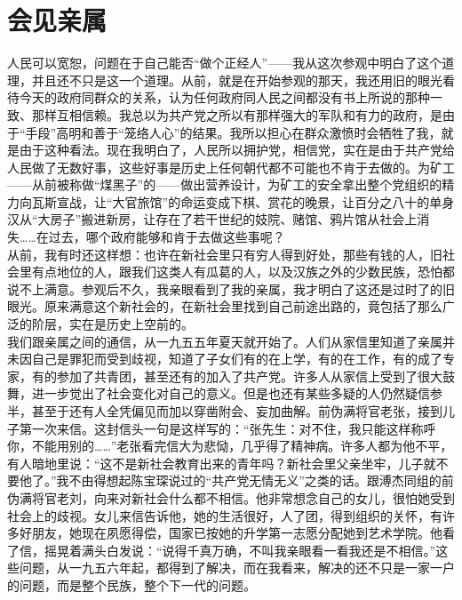 \fancyhead[RO]{} %
\fancyhead[LE]{} %
\chapter*{会见亲属}
\thispagestyle{empty}
人民可以宽恕，问题在于自己能否“做个正经人”——我从这次参观中明白了这个道理，并且还不只是这一个道理。从前，就是在开始参观的那天，我还用旧的眼光看待今天的政府同群众的关系，认为任何政府同人民之间都没有书上所说的那种一致、那样互相信赖。我总以为共产党之所以有那样强大的军队和有力的政府，是由于“手段”高明和善于“笼络人心”的结果。我所以担心在群众激愤时会牺牲了我，就是由于这种看法。现在我明白了，人民所以拥护党，相信党，实在是由于共产党给人民做了无数好事，这些好事是历史上任何朝代都不可能也不肯于去做的。为矿工——从前被称做“煤黑子”的——做出营养设计，为矿工的安全拿出整个党组织的精力向瓦斯宣战，让“大官旅馆”的命运变成下棋、赏花的晚景，让百分之八十的单身汉从“大房子”搬进新房，让存在了若干世纪的妓院、赌馆、鸦片馆从社会上消失……在过去，哪个政府能够和肯于去做这些事呢？　\\

从前，我有时还这样想：也许在新社会里只有穷人得到好处，那些有钱的人，旧社会里有点地位的人，跟我们这类人有瓜葛的人，以及汉族之外的少数民族，恐怕都说不上满意。参观后不久，我亲眼看到了我的亲属，我才明白了这还是过时了的旧眼光。原来满意这个新社会的，在新社会里找到自己前途出路的，竟包括了那么广泛的阶层，实在是历史上空前的。\\

我们跟亲属之间的通信，从一九五五年夏天就开始了。人们从家信里知道了亲属并未因自己是罪犯而受到歧视，知道了子女们有的在上学，有的在工作，有的成了专家，有的参加了共青团，甚至还有的加入了共产党。许多人从家信上受到了很大鼓舞，进一步觉出了社会变化对自己的意义。但是也还有某些多疑的人仍然疑信参半，甚至于还有人全凭偏见而加以穿凿附会、妄加曲解。前伪满将官老张，接到儿子第一次来信。这封信头一句是这样写的：“张先生：对不住，我只能这样称呼你，不能用别的……”老张看完信大为悲恸，几乎得了精神病。许多人都为他不平，有人暗地里说：“这不是新社会教育出来的青年吗？新社会里父亲坐牢，儿子就不要他了。”我不由得想起陈宝琛说过的“共产党无情无义”之类的话。跟溥杰同组的前伪满将官老刘，向来对新社会什么都不相信。他非常想念自己的女儿，很怕她受到社会上的歧视。女儿来信告诉他，她的生活很好，人了团，得到组织的关怀，有许多好朋友，她现在夙愿得偿，国家已按她的升学第一志愿分配她到艺术学院。他看了信，摇晃着满头白发说：“说得千真万确，不叫我亲眼看一看我还是不相信。”这些问题，从一九五六年起，都得到了解决，而在我看来，解决的还不只是一家一户的问题，而是整个民族，整个下一代的问题。\\


